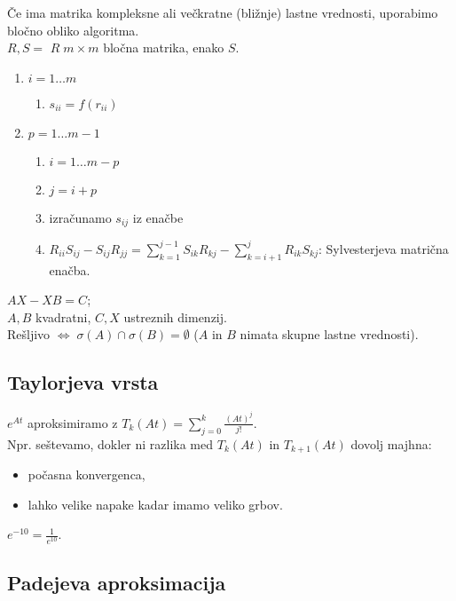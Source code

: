 \documentclass[a4paper, 12pt]{book}
\theoremstyle{definition}
\theoremstyle{remark}
\begin{document}
Če ima matrika kompleksne ali večkratne (bližnje) lastne vrednosti, uporabimo bločno obliko algoritma. \\
$R, S =$
$R \; m \times m$ bločna matrika, enako $S$. \\
\begin{enumerate}[label={}]
    \item $i = 1 \dots m$
    \begin{enumerate}[label={}]
        \item $s_{ii} = f(r_{ii})$
    \end{enumerate}
    \item $p = 1 \dots m-1$
    \begin{enumerate}[label={}]
        \item $i = 1 \dots m-p$
        \item $j = i+p$
        \item izračunamo $s_{ij}$ iz enačbe
        \item $R_{ii} S_{ij} - S_{ij} R_{jj} = \sum_{k=1}^{j-1} S_{ik} R_{kj} - \sum_{k=i+1}^j R_{ik} S_{kj}$:
            Sylvesterjeva matrična enačba.
    \end{enumerate}
\end{enumerate}
$AX - XB = C$; \\
$A, B$ kvadratni, $C, X$ ustreznih dimenzij. \\
Rešljivo $\iff \; \sigma(A) \cap \sigma(B) = \emptyset$ ($A$ in $B$ nimata skupne lastne vrednosti).

\subsection{Taylorjeva vrsta}

$e^{At}$ aproksimiramo z $T_k(At) = \sum_{j=0}^k \frac{(At)^j}{j!}$. \\
Npr. seštevamo, dokler ni razlika med $T_k(At)$ in $T_{k+1}(At)$ dovolj majhna:
\begin{itemize}
    \item počasna konvergenca,
    \item lahko velike napake kadar imamo veliko grbov.
\end{itemize}
$e^{-10} = \frac{1}{e^{10}}$.

\subsection{Padejeva aproksimacija}
\end{document}

